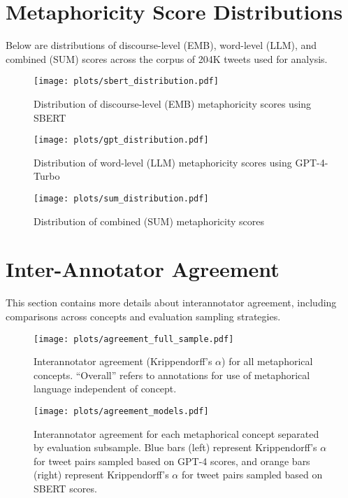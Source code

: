 \section{Metaphoricity Score Distributions}
Below are distributions of discourse-level (EMB), word-level (LLM), and combined (SUM) scores across the corpus of 204K tweets used for analysis.

\begin{figure}[htbp!]
    \centering
    \texttt{[image: plots/sbert\_distribution.pdf]}
    \caption{Distribution of discourse-level (EMB) metaphoricity scores using SBERT}
    \label{fig:dist-sbert}
\end{figure}

\begin{figure}[htbp!]
    \centering
    \texttt{[image: plots/gpt\_distribution.pdf]}
    \caption{Distribution of word-level (LLM) metaphoricity scores using GPT-4-Turbo}
    \label{fig:dist-gpt}
\end{figure}

\begin{figure}[htbp!]
    \centering
    \texttt{[image: plots/sum\_distribution.pdf]}
    \caption{Distribution of combined (SUM) metaphoricity scores}
    \label{fig:dist-sum}
\end{figure}

\newpage
\section{Inter-Annotator Agreement}
This section contains more details about interannotator agreement, including comparisons across concepts and evaluation sampling strategies. 

\begin{figure}[htbp!]
    \centering
    \texttt{[image: plots/agreement\_full\_sample.pdf]}
    \caption{Interannotator agreement (Krippendorff's $\alpha$) for all metaphorical concepts. ``Overall'' refers to annotations for use of metaphorical language independent of concept.}
    \label{fig:agreement-overall}
\end{figure}

\begin{figure}[htbp!]
    \centering
    \texttt{[image: plots/agreement\_models.pdf]}
    \caption{Interannotator agreement for each metaphorical concept separated by evaluation subsample. Blue bars (left) represent Krippendorff's $\alpha$ for tweet pairs sampled based on GPT-4 scores, and orange bars (right) represent Krippendorff's $\alpha$ for tweet pairs sampled based on SBERT scores.}
    \label{fig:agreement-models}
\end{figure}


